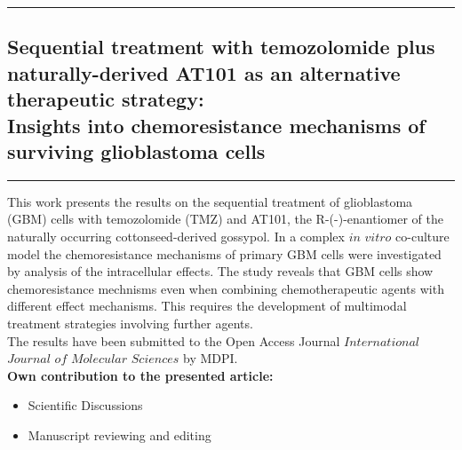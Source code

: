 \newpage
\vspace{0.3cm}
\hrule
\subsection*{\Huge Sequential treatment with temozolomide plus naturally-derived AT101 as an alternative therapeutic strategy:\\ Insights into chemoresistance mechanisms of surviving glioblastoma cells}
\hrule
\vspace{1.5cm}

This work presents the results on the sequential treatment of glioblastoma (GBM) cells with temozolomide (TMZ) and AT101, the R-(-)-enantiomer of the naturally occurring cottonseed-derived gossypol. In a complex $in$ $vitro$ co-culture model the chemoresistance mechanisms of primary GBM cells were investigated by analysis of the intracellular effects. The study reveals that GBM cells show chemoresistance mechnisms even when combining chemotherapeutic agents with different effect mechanisms. This requires the development of multimodal treatment strategies involving further agents.\\

The results have been submitted to the Open Access Journal $International$ $Journal$ $of$ $Molecular$ $Sciences$ by MDPI.\\

\textbf{Own contribution to the presented article:}
\begin{itemize}
\item Scientific Discussions
\item Manuscript reviewing and editing
\end{itemize}
% 